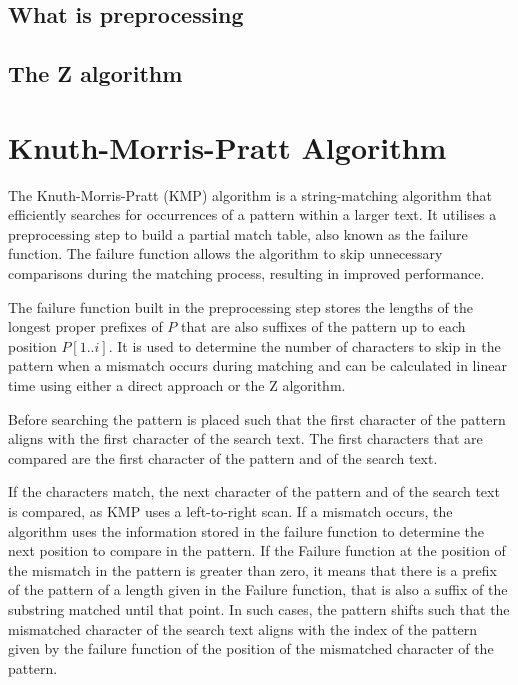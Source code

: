 \subsection{What is preprocessing}



\subsection{The Z algorithm}






\section{Knuth-Morris-Pratt Algorithm}
The Knuth-Morris-Pratt (KMP) algorithm is a string-matching algorithm that efficiently searches for occurrences of a pattern within a larger text. It utilises a preprocessing step to build a partial match table, also known as the failure function. The failure function allows the algorithm to skip unnecessary comparisons during the matching process, resulting in improved performance.

The failure function built in the preprocessing step stores the lengths of the longest proper prefixes of $P$ that are also suffixes of the pattern up to each position $P[1..i]$. It is used to determine the number of characters to skip in the pattern when a mismatch occurs during matching and can be calculated in linear time using either a direct approach or the Z algorithm. 

Before searching the pattern is placed such that the first character of the pattern aligns with the first character of the search text. The first characters that are compared are the first character of the pattern and of the search text. 

If the characters match, the next character of the pattern and of the search text is compared, as KMP uses a left-to-right scan. 
If a mismatch occurs, the algorithm uses the information stored in the failure function to determine the next position to compare in the pattern. If the Failure function at the position of the mismatch in the pattern is greater than zero, it means that there is a prefix of the pattern of a length given in the Failure function, that is also a suffix of the substring matched until that point. In such cases, the pattern shifts such that the mismatched character of the search text aligns with the index of the pattern given by the failure function of the position of the mismatched character of the pattern.

